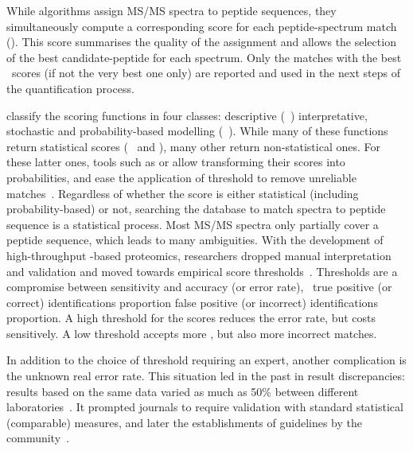 
While algorithms assign \gls{MS/MS} spectra to peptide sequences,
they simultaneously compute a corresponding score
for each peptide-spectrum match (\psm).
This score summarises the quality of the assignment
and allows the selection of the best candidate-peptide for each spectrum.
Only the matches with the best \psm\ scores (if not the very best one only)
are reported and used in the next steps of the quantification process.\mybr\

\citet{Sadygov2004-nl} classify the scoring functions in four classes:
descriptive (\eg\ )
interpretative, stochastic and probability-based modelling (\eg\ ).
While many of these functions return statistical scores
(\eg\  and ),
many other return non-statistical ones.
For these latter ones,
tools such as 
or 
allow transforming their scores into probabilities,
and ease the application of threshold to remove unreliable matches~.
Regardless of whether the score is either statistical (including probability-based) or not,
searching the database to match spectra to peptide sequence is a statistical process.
Most \gls{MS/MS} spectra only partially cover a peptide sequence,
which leads to many ambiguities.
With the development of high-throughput \ms-based proteomics,
researchers dropped manual interpretation and validation
and moved towards empirical score thresholds~.
Thresholds are a compromise between sensitivity and accuracy (or error rate),
\ie\ true positive (or correct) identifications proportion
 false positive (or incorrect) identifications proportion.
A high threshold for the scores reduces the error rate, but costs sensitively.
A low threshold accepts more \psms, but also more incorrect matches.\mybr\

In addition to the choice of threshold requiring an expert,
another complication is the unknown real error rate.
This situation led in the past in result discrepancies:
results based on the same data varied
as much as 50\% between different laboratories~.
It prompted journals to require validation
with standard statistical (comparable) measures,
and later the establishments of guidelines by the
community~.\mybr\

